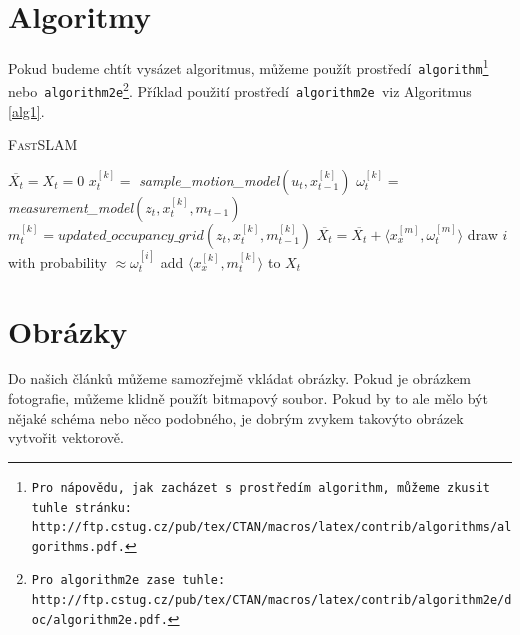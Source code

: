 \documentclass[a4paper, 11pt]{article}
\begin{document}
\section{Algoritmy}\label{alg}

Pokud budeme chtít vysázet algoritmus, můžeme použít prostředí\texttt{ algorithm\footnote{Pro nápovědu, jak zacházet s~prostředím\texttt{ algorithm,} můžeme zkusit tuhle stránku:\\{http://ftp.cstug.cz/pub/tex/CTAN/macros/latex/contrib/algorithms/algorithms.pdf}.} }
nebo\texttt{ algorithm2e\footnote{Pro\texttt{ algorithm2e }zase tuhle:
{http://ftp.cstug.cz/pub/tex/CTAN/macros/latex/contrib/algorithm2e/doc/algorithm2e.pdf}.}}.
Příklad použití prostředí\texttt{ algorithm2e }viz Algoritmus \ref{alg1}.\\

\bigskip
\begin{algorithm}[H] \label{alg1}
	\caption{\scshape FastSLAM}
	\DontPrintSemicolon
	\SetNlSty{}{}{:}
	\SetInd{1em}{1em}
	\SetNlSkip{-1.33em}

\BlankLine
\Indp \Indp
	$\overline{X_t}=X_t=0$\;
	{
		$x_{t}^{[k]}=$ \emph{sample\_motion\_model}$(u_t,x_{t-1}^{[k]})$\;
		$\omega_{t}^{[k]}=$ \emph{measurement\_model}$(z_t,x_{t}^{[k]},m_{t-1})$\;
		$m_{t}^{[k]}=updated\_occupancy\_grid(z_t,x_{t}^{[k]},m_{t-1}^{[k]})$\;
		$\overline{X_t}=\overline{X_t}+\langle x_{x}^{[m]},\omega_{t}^{[m]}\rangle$\;
	}
	{
		draw $i$ with probability $\approx \omega_t^{[i]}$\;
		add $\langle x_{x}^{[k]},m_{t}^{[k]}\rangle$ to $X_t$\;
	}
\end{algorithm}

\medskip

\section{Obrázky}

Do našich článků můžeme samozřejmě vkládat obrázky. Pokud je obrázkem fotografie, můžeme klidně použít bitmapový soubor. Pokud by to ale mělo být nějaké schéma nebo něco podobného, je dobrým zvykem takovýto obrázek vytvořit vektorově.
\end{document}
